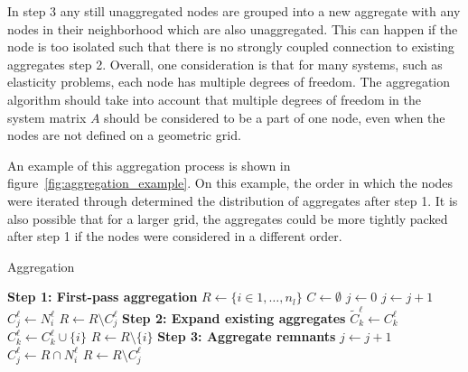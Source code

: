 In step 3 any still unaggregated nodes are grouped into a new aggregate with any nodes in their neighborhood which are also unaggregated. This can happen if the node is too isolated such that there is no strongly coupled connection to existing aggregates step 2. Overall, one consideration is that for many systems, such as elasticity problems, each node has multiple degrees of freedom. The aggregation algorithm should take into account that multiple degrees of freedom in the system matrix $A$ should be considered to be a part of one node, even when the nodes are not defined on a geometric grid.

An example of this aggregation process is shown in figure~\ref{fig:aggregation_example}. On this example, the order in which the nodes were iterated through determined the distribution of aggregates after step 1. It is also possible that for a larger grid, the aggregates could be more tightly packed after step 1 if the nodes were considered in a different order.

\begin{algorithm}
	\caption{Aggregation}\label{alg:aggregation}
	\begin{algorithmic}[1]
			\Statex \textbf{Step 1: First-pass aggregation}
			\State $R \gets \{ i \in 1, \ldots, n_l\}$ 
			\State $C \gets \emptyset$ 
			\State $j \gets 0$ 
					\State $j \gets j+1$
					\State $C_j^\ell \gets N_i^\ell$ 
					\State $R \gets R \setminus C_j^\ell$ 
				\EndIf
			\EndFor {}
			\Statex
			\Statex \textbf{Step 2: Expand existing aggregates}
				\State $\tilde{C}_k^\ell \gets C_k^\ell$
			\EndFor
			 
				 
					\State $C_k^\ell \gets C_k^\ell \cup \{ i \}$ 
					\State $R \gets R \setminus \{ i \} $
				\EndIf
			\EndFor
			\Statex
			\Statex \textbf{Step 3: Aggregate remnants}
			 
				\State $j \gets j + 1$
				\State $C_j^\ell \gets R \cap N_i^\ell$ 
				\State $R \gets R \setminus C_j^\ell$
			\EndFor
		\EndProcedure
	\end{algorithmic}
\end{algorithm}


